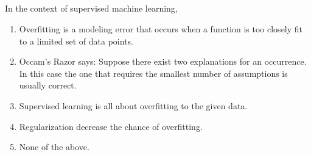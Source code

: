\begin{frame}
\section{}
In the context of supervised machine learning,
\begin{enumerate}
\item Overfitting is a modeling error that occurs when a function is too closely fit to a limited set of data points.   %
\item Occam's Razor says: Suppose there exist two explanations for an occurrence. In this case the one that requires the smallest number of assumptions is usually correct.     %
\item Supervised learning is all about overfitting to the given data.
\item Regularization decrease the chance of overfitting.    %
\item None of the above.        %
\end{enumerate}
\end{frame}
